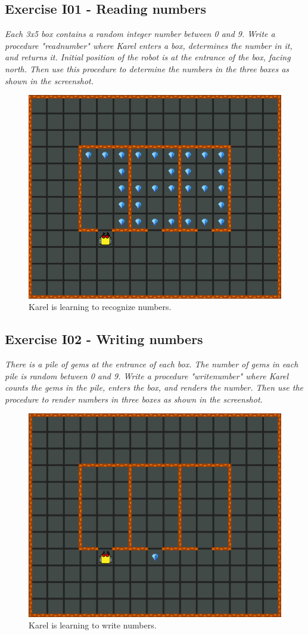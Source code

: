 \documentclass[article,A4,12pt]{llncs}
\begin{document}
{{{{\subsection{Exercise I01 - Reading numbers}

{\em Each 3x5 box contains a random integer number between 0 and 9. Write a procedure "readnumber" 
where Karel enters a box, determines the number in it, and returns it. Initial position of the 
robot is at the entrance of the box, facing north. Then use this procedure to determine the numbers 
in the three boxes as shown in the screenshot. }

\begin{figure}[!ht]
\begin{center}
\includegraphics[height=0.4\textwidth]{img/i01.png}
\end{center}
\vspace{-4mm}
\caption{Karel is learning to recognize numbers.}
\label{fig:g10}
\vspace{-4mm}
\end{figure}
\noindent
\newpage

\subsection{Exercise I02 - Writing numbers}

{\em There is a pile of gems at the entrance of each box. The number of gems in each pile is random between 0 and 9. Write a procedure "writenumber" where Karel counts the gems in the pile, enters the box, and renders the number. Then use the procedure to render numbers in three boxes as shown in the screenshot. }\\[-7mm]

\begin{figure}[!ht]
\begin{center}
\includegraphics[height=0.4\textwidth]{img/i02.png}
\end{center}
\vspace{-4mm}
\caption{Karel is learning to write numbers.}
\label{fig:g11}
\vspace{-10mm}
\end{figure}
\noindent

}}}}
\end{document}
